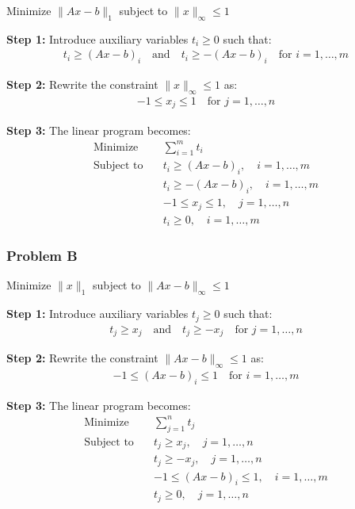 \documentclass{article}
\begin{document}
Minimize $\|Ax - b\|_1$ subject to $\|x\|_\infty \leq 1$

\textbf{Step 1:} Introduce auxiliary variables $t_i \geq 0$ such that:
\begin{align*}
    t_i \geq (Ax - b)_i \quad \text{and} \quad t_i \geq -(Ax - b)_i \quad \text{for } i = 1, \dots, m
\end{align*}

\textbf{Step 2:} Rewrite the constraint $\|x\|_\infty \leq 1$ as:
\begin{align*}
    -1 \leq x_j \leq 1 \quad \text{for } j = 1, \dots, n
\end{align*}

\textbf{Step 3:} The linear program becomes:
\begin{align*}
    \text{Minimize} \quad & \sum_{i=1}^m t_i \\
    \text{Subject to} \quad & t_i \geq (Ax - b)_i, \quad i = 1, \dots, m \\
    & t_i \geq -(Ax - b)_i, \quad i = 1, \dots, m \\
    & -1 \leq x_j \leq 1, \quad j = 1, \dots, n \\
    & t_i \geq 0, \quad i = 1, \dots, m
\end{align*}

\subsubsection*{Problem B}

Minimize $\|x\|_1$ subject to $\|Ax - b\|_\infty \leq 1$

\textbf{Step 1:} Introduce auxiliary variables $t_j \geq 0$ such that:
\begin{align*}
    t_j \geq x_j \quad \text{and} \quad t_j \geq -x_j \quad \text{for } j = 1, \dots, n
\end{align*}

\textbf{Step 2:} Rewrite the constraint $\|Ax - b\|_\infty \leq 1$ as:
\begin{align*}
    -1 \leq (Ax - b)_i \leq 1 \quad \text{for } i = 1, \dots, m
\end{align*}

\textbf{Step 3:} The linear program becomes:
\begin{align*}
    \text{Minimize} \quad & \sum_{j=1}^n t_j \\
    \text{Subject to} \quad & t_j \geq x_j, \quad j = 1, \dots, n \\
    & t_j \geq -x_j, \quad j = 1, \dots, n \\
    & -1 \leq (Ax - b)_i \leq 1, \quad i = 1, \dots, m \\
    & t_j \geq 0, \quad j = 1, \dots, n
\end{align*}
\end{document}
